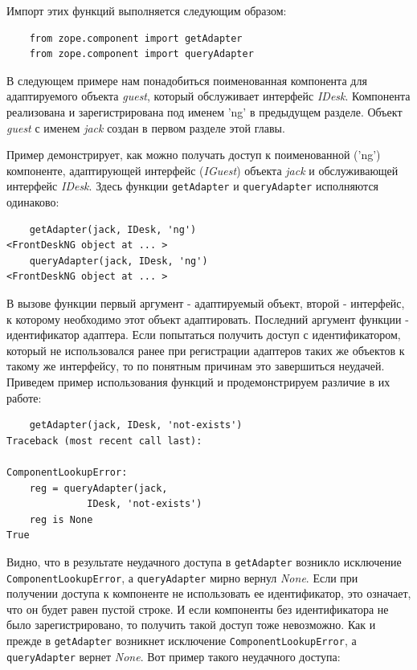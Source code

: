 \documentclass[a4paper,openany,twoside,draft]{book}
\providecommand*{\DUroletitlereference}[1]{\textsl{#1}}
\begin{document}
Импорт этих функций выполняется следующим образом:

\begin{verbatim}
    from zope.component import getAdapter
    from zope.component import queryAdapter
\end{verbatim}

В следующем примере нам понадобиться поименованная компонента для адаптируемого объекта \DUroletitlereference{guest}, который обслуживает интерфейс \DUroletitlereference{IDesk}.  Компонента реализована и зарегистрирована под именем 'ng' в предыдущем разделе.  Объект \DUroletitlereference{guest} с именем \DUroletitlereference{jack} создан в первом разделе этой главы.

Пример демонстрирует, как можно получать доступ к поименованной ('ng') компоненте, адаптирующей интерфейс (\DUroletitlereference{IGuest}) объекта \DUroletitlereference{jack} и обслуживающей интерфейс \DUroletitlereference{IDesk}.  Здесь функции \texttt{getAdapter} и \texttt{queryAdapter} исполняются одинаково:

\begin{verbatim}
    getAdapter(jack, IDesk, 'ng')
<FrontDeskNG object at ... >
    queryAdapter(jack, IDesk, 'ng')
<FrontDeskNG object at ... >
\end{verbatim}

В вызове функции первый аргумент - адаптируемый объект, второй - интерфейс, к которому необходимо этот объект адаптировать.  Последний аргумент функции - идентификатор адаптера.  Если попытаться получить доступ с идентификатором, который не использовался ранее при регистрации адаптеров таких же объектов к такому же интерфейсу, то по понятным причинам это завершиться неудачей.  Приведем пример использования функций и продемонстрируем различие в их работе:

\begin{verbatim}
    getAdapter(jack, IDesk, 'not-exists')
Traceback (most recent call last):

ComponentLookupError:
    reg = queryAdapter(jack,
              IDesk, 'not-exists')
    reg is None
True
\end{verbatim}

Видно, что в результате неудачного доступа в \texttt{getAdapter} возникло исключение \texttt{ComponentLookupError}, а \texttt{queryAdapter} мирно вернул \DUroletitlereference{None}.  Если при получении доступа к компоненте не использовать ее идентификатор, это означает, что он будет равен пустой строке.  И если компоненты без идентификатора не было зарегистрировано, то получить такой доступ тоже невозможно.  Как и прежде в \texttt{getAdapter} возникнет исключение \texttt{ComponentLookupError}, а \texttt{queryAdapter} вернет \DUroletitlereference{None}.  Вот пример такого неудачного доступа:
\end{document}
